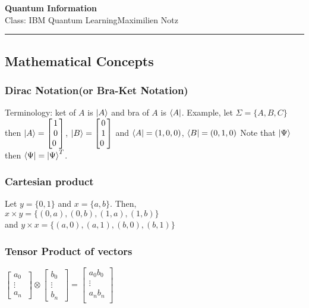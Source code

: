\documentclass[5pt]{article}
\begin{document}
\begin{center}
     \Large{\textbf{Quantum Information}}\\
     \small{Class: IBM Quantum Learning}\hfill\small{\textcopyright Maximilien Notz \the\year{}}
     \noindent\rule{20.2cm}{0.4pt}
\end{center}


\begin{multicols}{3}
\setcounter{secnumdepth}{0}

\subsection{Mathematical Concepts}

\subsubsection{Dirac Notation\footnotesize{(or Bra-Ket Notation)}}
Terminology: ket of $A$ is $\ket{A}$ and bra of $A$ is $\bra{A}$.
Example, let $\Sigma=\{A,B,C\}$ then $\ket{A}=\begin{bmatrix}1\\0\\0\ \end{bmatrix}$, $\ket{B}=\begin{bmatrix}0\\1\\0\ \end{bmatrix}$
and $\bra{A}=(1,0,0)$, $\bra{B}=(0,1,0)$
Note that $\ket{\Psi}$ then $\bra{\Psi}=\ket{\Psi}^T$.

\subsubsection{Cartesian product}
Let $y=\{0,1\}$ and  $x=\{a,b\}$. Then,\\
$x\times y = \{(0,a),(0,b),(1,a),(1,b)\}$\\
and $y\times x = \{(a,0),(a,1),(b,0),(b,1)\}$\\

\subsubsection{Tensor Product of vectors}
$\begin{bmatrix}a_0\\ \vdots\\a_n\ \end{bmatrix}\otimes\begin{bmatrix}b_0\\ \vdots\\b_n\ \end{bmatrix}= \begin{bmatrix}a_0b_0\\ \vdots\\a_nb_n\\ \end{bmatrix}$



\end{multicols}
\end{document}
